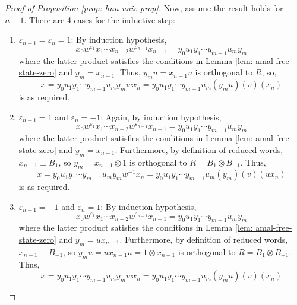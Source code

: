 \documentclass{amsart}
\theoremstyle{definition}
\begin{document}
\begin{proof}[Proof of Proposition \ref{prop: hnn-univ-prop}]
    Now, assume the result holds for $n - 1$. There are 4 cases for the inductive step:
    \begin{enumerate}
        \item $\varepsilon_{n-1} = \varepsilon_n = 1$: By induction hypothesis,
        \begin{equation*}
            x_0w^{\varepsilon_1}x_1\cdots x_{n-2}w^{\varepsilon_{n-1}}x_{n-1} = y_0u_1y_1 \cdots y_{m-1}u_my_m
        \end{equation*}
        where the latter product satisfies the conditions in Lemma \ref{lem: amal-free-state-zero} and $y_m = x_{n-1}$. Thus, $y_mu = x_{n-1}u$ is orthogonal to $R$, so,
        \begin{equation*}
            x = y_0u_1y_1 \cdots y_{m-1}u_my_mwx_n = y_0u_1y_1 \cdots y_{m-1}u_m(y_mu)(v)(x_n)
        \end{equation*}
        is as required.
        \item $\varepsilon_{n-1} = 1$ and $\varepsilon_n = -1$: Again, by induction hypothesis,
        \begin{equation*}
            x_0w^{\varepsilon_1}x_1\cdots x_{n-2}w^{\varepsilon_{n-1}}x_{n-1} = y_0u_1y_1 \cdots y_{m-1}u_my_m
        \end{equation*}
        where the latter product satisfies the conditions in Lemma \ref{lem: amal-free-state-zero} and $y_m = x_{n-1}$. Furthermore, by definition of reduced words, $x_{n-1} \perp B_1$, so $y_m = x_{n-1} \otimes 1$ is orthogonal to $R = B_1 \otimes B_{-1}$. Thus,
        \begin{equation*}
            x = y_0u_1y_1 \cdots y_{m-1}u_my_mw^{-1}x_n = y_0u_1y_1 \cdots y_{m-1}u_m(y_m)(v)(ux_n)
        \end{equation*}
        is as required.
        \item $\varepsilon_{n-1} = -1$ and $\varepsilon_n = 1$: By induction hypothesis,
        \begin{equation*}
            x_0w^{\varepsilon_1}x_1\cdots x_{n-2}w^{\varepsilon_{n-1}}x_{n-1} = y_0u_1y_1 \cdots y_{m-1}u_my_m
        \end{equation*}
        where the latter product satisfies the conditions in Lemma \ref{lem: amal-free-state-zero} and $y_m = ux_{n-1}$. Furthermore, by definition of reduced words, $x_{n-1} \perp B_{-1}$, so $y_mu = ux_{n-1}u = 1 \otimes x_{n-1}$ is orthogonal to $R = B_1 \otimes B_{-1}$. Thus,
        \begin{equation*}
            x = y_0u_1y_1 \cdots y_{m-1}u_my_mwx_n = y_0u_1y_1 \cdots y_{m-1}u_m(y_mu)(v)(x_n)

\end{equation*}
\end{enumerate}
\end{proof}
\end{document}
